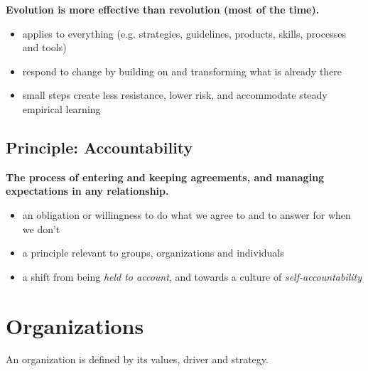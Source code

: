 \textbf{Evolution is more effective than revolution (most of the time).}

\begin{itemize}
\item applies to everything (e.g. strategies, guidelines, products, skills, processes and tools)

\item respond to change by building on and transforming what is already there

\item small steps create less resistance, lower risk, and accommodate steady empirical learning

\end{itemize}

\section{Principle: Accountability}
\label{principle:accountability}

\textbf{The process of entering and keeping agreements, and managing expectations in any relationship.}

\begin{itemize}
\item an obligation or willingness to do what we agree to and to answer for when we don’t

\item a principle relevant to groups, organizations and individuals

\item a shift from being \emph{held to account}, and towards a culture of \emph{self-accountability}

\end{itemize}

\chapter{Organizations}
\label{organizations}

An organization is defined by its values, driver and strategy.

